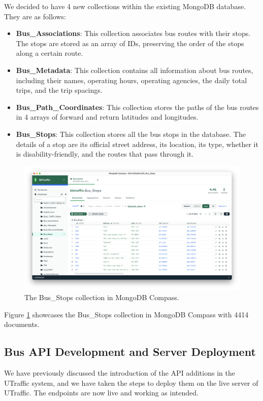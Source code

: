 We decided to have 4 new collections within the existing MongoDB database. They are as follows:
\begin{itemize}
    \item \textbf{Bus\_Associations}: This collection associates bus routes with their stops. The stops are stored as an array of IDs, preserving the order of the stops along a certain route.
    \item \textbf{Bus\_Metadata}: This collection contains all information about bus routes, including their names, operating hours, operating agencies, the daily total trips, and the trip spacings.
    \item \textbf{Bus\_Path\_Coordinates}: This collection stores the paths of the bus routes in 4 arrays of forward and return latitudes and longitudes.
    \item \textbf{Bus\_Stops}: This collection stores all the bus stops in the database. The details of a stop are its official street address, its location, its type, whether it is disability-friendly, and the routes that pass through it.
\end{itemize}
\begin{figure}
    \centering
    \includegraphics[width=\textwidth]{assets/images/Implementation/db_compass.png}
    \caption{The Bus\_Stops collection in MongoDB Compass.}
    \label{fig:dbcompass}
\end{figure}
Figure \ref{fig:dbcompass} showcases the Bus\_Stops collection in MongoDB Compass with 4414 documents.

\subsection{Bus API Development and Server Deployment}
We have previously discussed the introduction of the API additions in the UTraffic system, and we have taken the steps to deploy them on the live server of UTraffic. The endpoints are now live and working as intended.
